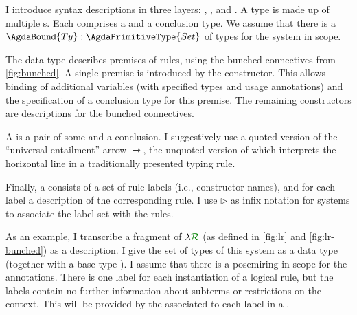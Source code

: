 I introduce syntax descriptions in three layers: ,
, and .
A type  is made up of multiple s.
Each  comprises a  and
a conclusion type. We assume that there is a
$\AgdaBound{Ty} : \AgdaPrimitiveType{Set}$ of types for the system in
scope.

The  data type describes premises of rules,
using the bunched connectives from \cref{fig:bunched}. A single
premise is introduced by the
constructor.  This allows binding of additional variables
\AgdaBound{$\Delta$} (with specified types and usage annotations) and
the specification of a conclusion type  for this premise.
The remaining constructors are descriptions for the
bunched connectives. %


A  is a pair of some  and a
conclusion.
I suggestively use a quoted version of the ``universal entailment'' arrow
$\rightarrowtriangle$, the unquoted version of which interprets the horizontal
line in a traditionally presented typing rule.


Finally, a  consists of a set of rule labels (i.e.,
constructor names), and for each label a description of the
corresponding rule. I use $\rhd$ as infix notation for systems to
associate the label set with the rules.



As an example, I transcribe a fragment of $\name$ (as defined in
\cref{fig:lr} and \cref{fig:lr-bunched}) as a description.
I give the set of types of
this system as a data type  (together with a base
type \AgdaInductiveConstructor{$\iota$}).
I assume that there is a
posemiring  in scope for the
annotations.
There is one label for each instantiation of a logical
rule, but the labels contain no further information about subterms or
restrictions on the context.
This will be provided by the  associated to each label in a
.

